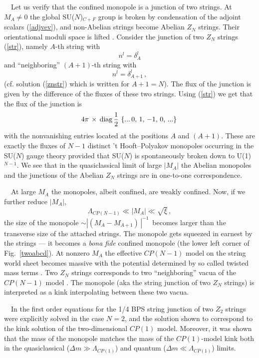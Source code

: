\documentclass[epsfig,12pt]{article}
\def\beq{\begin{equation}}
\def\eeq{\end{equation}}
\begin{document}
\begin{itemize}
\mbox{} \,\,\,\, Let us verify that the confined monopole is a junction of two strings.
At $M_A\neq 0$ the global SU($N$)$_{C+F}$ group is broken by
condensation of the adjoint scalars (\ref{adjvev}), and non-Abelian strings 
become Abelian $Z_N$ strings. Their orientational moduli space is lifted
\cite{SYmon,HT2}.
Consider the junction of two $Z_N$ strings (\ref{str}), namely $A$-th string
with
\beq 
n^l=\delta^l_A
\label{Astring}
\eeq
and ``neighboring'' $(A+1)$-th string with
\beq 
n^l=\delta^l_{A+1}\,,
\label{A1string}
\eeq
(cf. solution (\ref{znstr}) which is written for $A+1=N$). The flux of the junction is
given by the difference of the fluxes of these two strings. Using (\ref{str})
we get that the flux of the junction is
\beq
  4\pi\,\times \, {\rm diag} \, \frac12\, \left\{  ...\, 0, \,1 ,\,  -1,\, 0
,\, ... \right\} \,
\label{monflux}
\eeq
with the nonvanishing entries located at the positions $A$ and $(A +1)$.
These are  exactly the  fluxes of $N-1$ distinct 't Hooft--Polyakov
monopoles occurring in the SU($N$) gauge theory provided that SU($N$)
is spontaneously broken down to U(1)$^{N-1}$. We see that
in the quasiclassical limit of large $|M_A|$ the Abelian
monopoles and the  junctions of the Abelian $Z_N$ strings
are in one-to-one correspondence. 

\mbox{} \,\,\,\, At large $M_A$ the monopoles, albeit confined, are weakly confined.
Now, if we further reduce $|M_A| $,
\beq
\Lambda_{CP(N-1)} \ll \left| M_A\right|   \ll \sqrt{\xi}\, ,
\label{ququr}
\eeq
the size of the monopole $\sim \left|(M_A-M_{A+1}) \,\right| ^{-1}\,$ becomes
larger than the transverse size of the attached strings.
The monopole gets squeezed  in earnest by
the strings --- it becomes  a {\em bona fide} confined
monopole (the  lower left corner of  Fig.~\ref{twoabcd}).
 At nonzero $M_A$
the effective $CP(N-1)$ model on the string world sheet becomes massive
with the potential determined by so called twisted mass terms \cite{Tong,SYmon,HT2}.
Two $Z_N$ strings corresponds  to two
``neighboring'' vacua of the $CP(N-1)$ model .
 The monopole (aka the string junction of two $Z_N$ strings) is
interpreted as a kink interpolating between these two vacua.

\mbox{} \,\,\,\, In \cite{SYmon} the first order equations for the 1/4 BPS string
junction of two $Z_2$ strings  were explicitly solved in the case $N=2$,
and the solution shown to correspond to the kink solution of
the two-dimensional $CP(1)$ model. Moreover, it was shown that the mass of the monopole matches
the mass of the $CP(1)$-model kink  both in the quasiclassical ($\Delta m\gg
\Lambda_{CP(1)}$)   and quantum  ($\Delta m \ll \Lambda_{CP(1)}$)
limits.


\end{itemize}
\end{document}
